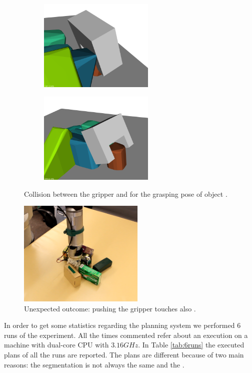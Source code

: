 \begin{figure}
\centering
\begin{subfigure}[t]{0.45\textwidth}
\centering
\includegraphics[width = 5.5cm]{Img/experiments/exp_good/grasp_o2.png}
\caption{}
\end{subfigure}
\begin{subfigure}[t]{0.45\textwidth}
\centering
\includegraphics[width = 5.5cm]{Img/experiments/exp_good/grasp_o2_2.png}
\caption{}
\end{subfigure}
\caption{Collision between the gripper and  for the grasping pose of object .}\label{fig:exp_good_grasp_o2}
\end{figure}

\begin{figure}[tb]
\centering
\includegraphics[width=6cm]{Img/experiments/exp_good/pushing_o0c.png}
\caption{Unexpected outcome: pushing  the gripper touches also .}\label{fig:pushing_o0}
\end{figure}

In order to get some statistics regarding the planning system we performed 6 runs of the experiment. All the times commented refer about an execution on a machine with dual-core CPU with $3.16GHz$. In Table \ref{tab:6runs} the executed plans of all the runs are reported. The plans are different because of two main reasons: the segmentation is not always the same\DM{,} and  the . 



